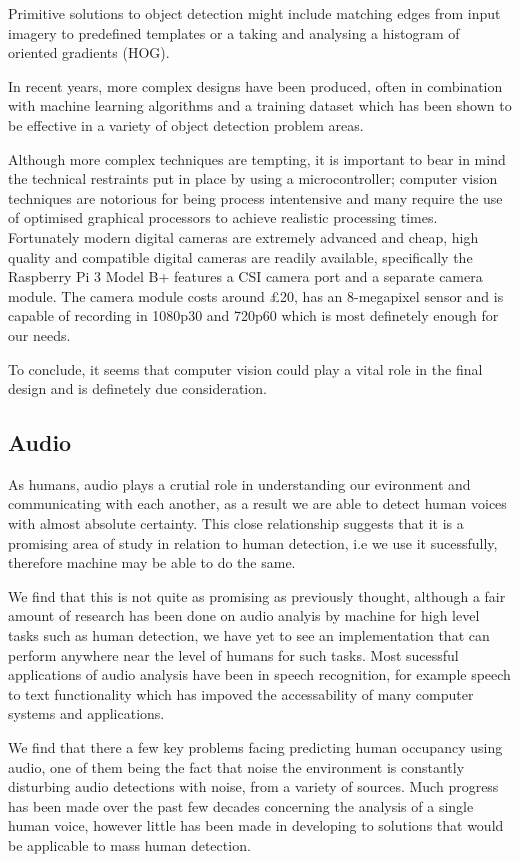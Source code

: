 \documentclass{l4proj}
\begin{document}
Primitive solutions to object detection might include matching edges from input imagery to predefined templates or a taking and analysing a histogram of oriented gradients (HOG). 

In recent years, more complex designs have been produced, often in combination with machine learning algorithms and a training dataset which has been shown to be effective in a variety of object detection problem areas. 

Although more complex techniques are tempting, it is important to bear in mind the technical restraints put in place by using a microcontroller; computer vision techniques are notorious for being process intentensive and many require the use of optimised graphical processors to achieve realistic processing times. Fortunately modern digital cameras are extremely advanced and cheap, high quality and compatible digital cameras are readily available, specifically the Raspberry Pi 3 Model B+ features a CSI camera port and a separate camera module. The camera module costs around £20, has an 8-megapixel sensor and is capable of recording in 1080p30 and 720p60\cite{c-picamera} which is most definetely enough for our needs.

To conclude, it seems that computer vision could play a vital role in the final design and is definetely due consideration.

\subsection{Audio}

As humans, audio plays a crutial role in understanding our evironment and communicating with each another, as a result we are able to detect human voices with almost absolute certainty. This close relationship suggests that it is a promising area of study in relation to human detection, i.e we use it sucessfully, therefore machine may be able to do the same. 

We find that this is not quite as promising as previously thought, although a fair amount of research has been done on audio analyis by machine for high level tasks such as human detection, we have yet to see an implementation that can perform anywhere near the level of humans for such tasks. Most sucessful applications of audio analysis have been in speech recognition, for example speech to text functionality which has impoved the accessability of many computer systems and applications.

We find that there a few key problems facing predicting human occupancy using audio, one of them being the fact that noise the environment is constantly disturbing audio detections with noise, from a variety of sources. Much progress has been made over the past few decades concerning the analysis of a single human voice, however little has been made in developing to solutions that would be applicable to mass human detection.
\end{document}
